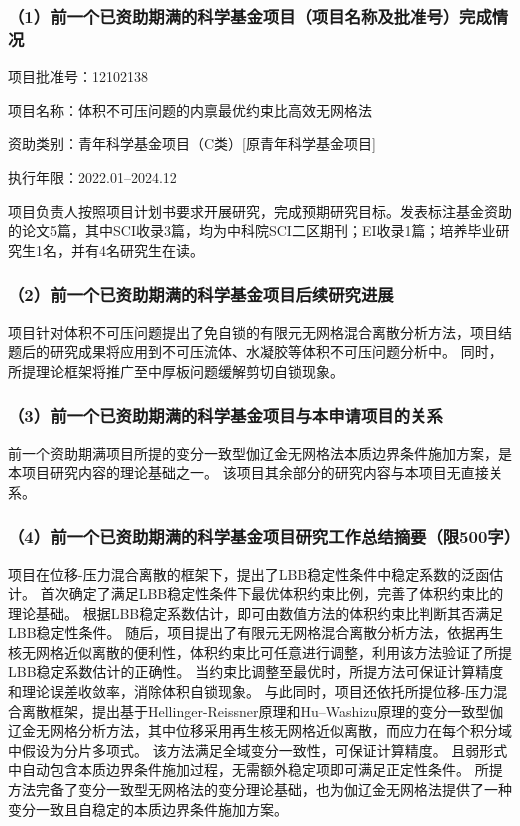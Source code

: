 
\subsubsection*{\bfseries （1）前一个已资助期满的科学基金项目（项目名称及批准号）完成情况}
\noindent
项目批准号：12102138

\noindent
项目名称：体积不可压问题的内禀最优约束比高效无网格法

\noindent
资助类别：青年科学基金项目（C类）[原青年科学基金项目]

\noindent
执行年限：2022.01--2024.12

项目负责人按照项目计划书要求开展研究，完成预期研究目标。发表标注基金资助的论文5篇，其中SCI收录3篇，均为中科院SCI二区期刊；EI收录1篇；培养毕业研究生1名，并有4名研究生在读。

\subsubsection*{\bfseries （2）前一个已资助期满的科学基金项目后续研究进展}
项目针对体积不可压问题提出了免自锁的有限元无网格混合离散分析方法，项目结题后的研究成果将应用到不可压流体、水凝胶等体积不可压问题分析中。
同时，所提理论框架将推广至中厚板问题缓解剪切自锁现象。

\subsubsection*{\bfseries （3）前一个已资助期满的科学基金项目与本申请项目的关系}
前一个资助期满项目所提的变分一致型伽辽金无网格法本质边界条件施加方案，是本项目研究内容的理论基础之一。
该项目其余部分的研究内容与本项目无直接关系。

\subsubsection*{\bfseries （4）前一个已资助期满的科学基金项目研究工作总结摘要（限500字）}

项目在位移-压力混合离散的框架下，提出了LBB稳定性条件中稳定系数的泛函估计。
首次确定了满足LBB稳定性条件下最优体积约束比例，完善了体积约束比的理论基础。
根据LBB稳定系数估计，即可由数值方法的体积约束比判断其否满足LBB稳定性条件。
随后，项目提出了有限元无网格混合离散分析方法，依据再生核无网格近似离散的便利性，体积约束比可任意进行调整，利用该方法验证了所提LBB稳定系数估计的正确性。
当约束比调整至最优时，所提方法可保证计算精度和理论误差收敛率，消除体积自锁现象。
与此同时，项目还依托所提位移-压力混合离散框架，提出基于Hellinger-Reissner原理和Hu–Washizu原理的变分一致型伽辽金无网格分析方法，其中位移采用再生核无网格近似离散，而应力在每个积分域中假设为分片多项式。
该方法满足全域变分一致性，可保证计算精度。
且弱形式中自动包含本质边界条件施加过程，无需额外稳定项即可满足正定性条件。
所提方法完备了变分一致型无网格法的变分理论基础，也为伽辽金无网格法提供了一种变分一致且自稳定的本质边界条件施加方案。

